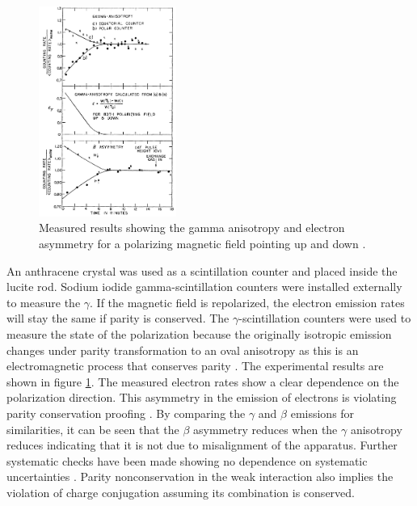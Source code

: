 \begin{figure}
    \centering
    \includegraphics[width=0.4\textwidth]{figs/resultsWu.png}
    \caption{Measured results showing the gamma anisotropy and electron asymmetry for a polarizing magnetic field pointing up and down \cite{PhysRev.105.1413}.}
    \label{fig:resultsWu}
\end{figure}
An anthracene crystal was used as a scintillation counter and placed inside the lucite rod.
Sodium iodide gamma-scintillation counters were installed externally to measure the $\gamma$.
If the magnetic field is repolarized, the electron emission rates will stay the same if parity is conserved. %
The $\gamma$-scintillation counters were used to measure the state of the polarization because the originally isotropic emission changes under parity transformation to an oval anisotropy as this is an electromagnetic process that conserves parity \cite{CaseStudies}.
The experimental results are shown in figure \ref{fig:resultsWu}.
The measured electron rates show a clear dependence on the polarization direction. %
This asymmetry in the emission of electrons is violating parity conservation proofing \cite{PhysRev.105.1413}.
By comparing the $\gamma$ and $\beta$ emissions for similarities, it can be seen that the $\beta$ asymmetry reduces when the $\gamma$ anisotropy reduces indicating that it is not due to misalignment of the apparatus.
Further systematic checks have been made showing no dependence on systematic uncertainties \cite{CaseStudies}.
Parity nonconservation in the weak interaction also implies the violation of charge conjugation assuming its combination is conserved.

